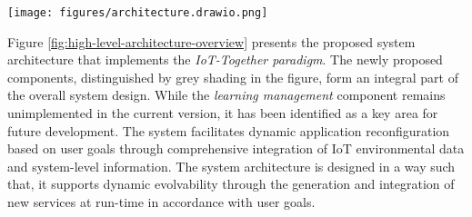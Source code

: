 \begin{figure*}[ht]
    \centering
    \texttt{[image: figures/architecture.drawio.png]}
    \caption{High-Level Architecture: System Components and Their Interactions}
    \label{fig:high-level-architecture-overview}
\end{figure*}


Figure \ref{fig:high-level-architecture-overview} presents the proposed system architecture that implements the \textit{IoT-Together paradigm}. The newly proposed components, distinguished by grey shading in the figure, form an integral part of the overall system design. While the \textit{learning management} component remains unimplemented in the current version, it has been identified as a key area for future development. The system facilitates dynamic application reconfiguration based on user goals through comprehensive integration of IoT environmental data and system-level information. The system architecture is designed in a way such that, it supports dynamic evolvability through the generation and integration of new services at run-time in accordance with user goals.

